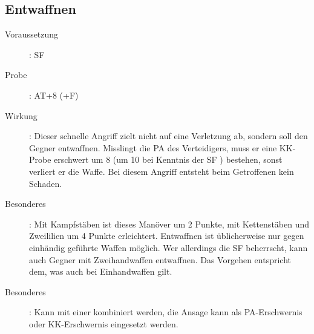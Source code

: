 \subsection{Entwaffnen}
\label{aktion.entwaffnen}
\begin{description}
    \item[Voraussetzung]:
        SF 
    \item[Probe]:
        AT+8 (+F)
    \item[Wirkung]:
        Dieser schnelle Angriff zielt nicht auf eine Verletzung ab, sondern soll den Gegner entwaffnen.
        Misslingt die PA des Verteidigers, muss er eine KK-Probe erschwert um 8 (um 10 bei Kenntnis der SF ) bestehen, sonst verliert er die Waffe.
        Bei diesem Angriff entsteht beim Getroffenen kein Schaden.
    \item[Besonderes]:
        Mit Kampfstäben ist dieses Manöver um 2 Punkte, mit Kettenstäben und Zweililien um 4 Punkte erleichtert.
        Entwaffnen ist üblicherweise nur gegen einhändig geführte Waffen möglich.
        Wer allerdings die SF  beherrscht, kann auch Gegner mit Zweihandwaffen entwaffnen.
        Das Vorgehen entspricht dem, was auch bei Einhandwaffen gilt.
    \item[Besonderes]:
        Kann mit einer  kombiniert werden, die Ansage kann als PA-Erschwernis oder KK-Erschwernis eingesetzt werden.
\end{description}
